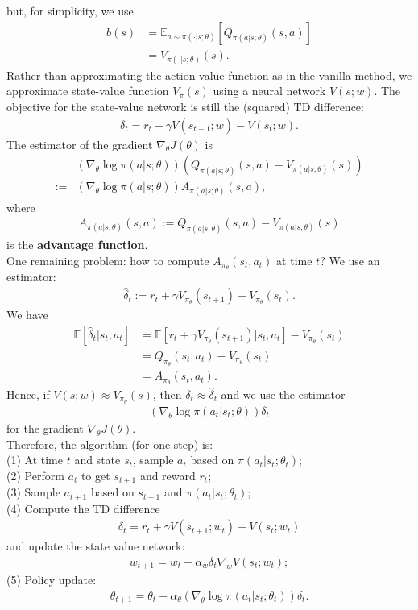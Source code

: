 \documentclass[12pt,oneside]{article}
\newcommand{\BE}[0]{\mathbb{E}}
\newcommand{\ali}[1]{\begin{align*}#1\end{align*}}
\newcommand{\ga}[0]{\gamma}
\theoremstyle{plain}
\theoremstyle{remark}
\begin{document}
but, for simplicity, we use 
\ali{b(s) &= \BE_{a \sim \pi(\cdot|s;\theta)} \left[ Q_{\pi(a|s;\theta)}(s, a) \right] \\
          &= V_{\pi(\cdot|s;\theta)}(s).}
Rather than approximating the action-value function as in the vanilla method, we approximate state-value function $V_\pi(s)$ using a neural network $V(s;w)$. The objective for the state-value network is still the (squared) TD difference:
\ali{\delta_t = r_t + \ga V(s_{t+1};w) - V(s_t;w).}
The estimator of the gradient $\nabla_\theta J(\theta)$ is 
\ali{&(\nabla_\theta \log \pi(a|s;\theta)) (Q_{\pi(a|s;\theta)}(s, a) - V_{\pi(a|s;\theta)}(s)) \\
    := &(\nabla_\theta \log \pi(a|s;\theta)) A_{\pi(a|s;\theta)}(s, a),}
where 
\ali{A_{\pi(a|s;\theta)}(s, a) := Q_{\pi(a|s;\theta)}(s, a) - V_{\pi(a|s;\theta)}(s)}
is the {\bf advantage function}.\\
One remaining problem: how to compute $A_{\pi_\theta}(s_t,a_t)$ at time $t$? We use an estimator:
\ali{ \hat{\delta}_t :=  r_t + \ga V_{\pi_\theta}(s_{t+1}) - V_{\pi_\theta}(s_t).}
We have
\ali{ \BE \left[\hat{\delta}_t | s_t, a_t \right] &= \BE \left[ r_t + \ga V_{\pi_\theta}(s_{t+1}) | s_t, a_t \right] - V_{\pi_\theta}(s_t) \\
&= Q_{\pi_\theta}(s_t, a_t) - V_{\pi_\theta}(s_t) \\
&= A_{\pi_\theta}(s_t, a_t).}
Hence, if $V(s;w) \approx V_{\pi_\theta}(s)$, then $\delta_t \approx \hat{\delta}_t$ and we use the estimator
\ali{(\nabla_\theta \log \pi(a_t|s_t;\theta)) \delta_t}
for the gradient $\nabla_\theta J(\theta)$.\\

Therefore, the algorithm (for one step) is:\\
(1) At time $t$ and state $s_t$, sample $a_t$ based on $\pi(a_t|s_t;\theta_t)$;\\
(2) Perform $a_t$ to get $s_{t+1}$ and reward $r_t$;\\
(3) Sample $a_{t+1}$ based on $s_{t+1}$ and $\pi(a_t|s_t;\theta_t)$;\\
(4) Compute the TD difference
\ali{\delta_t = r_t + \ga V(s_{t+1};w_t) - V(s_t;w_t)}
and update the state value network:
\ali{w_{t+1} = w_t + \alpha_w \delta_t \nabla_w V(s_t;w_t);}
(5) Policy update: 
\ali{\theta_{t+1} = \theta_t + \alpha_\theta  (\nabla_\theta \log \pi(a_t|s_t;\theta_t)) \delta_t.}














      
\end{document}
